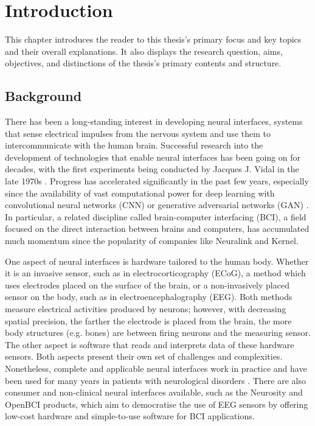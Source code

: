 \chapter{Introduction}
\graphicspath{{Chapter1/Figs/}{Chapter1/Figs/}}

This chapter introduces the reader to this thesis's primary focus and key topics and their overall explanations. It also displays the research question, aims, objectives, and distinctions of the thesis's primary contents and structure.

\section{Background}
\label{chapter1-background}

There has been a long-standing interest in developing neural interfaces, systems that sense electrical impulses from the nervous system and use them to intercommunicate with the human brain. Successful research into the development of technologies that enable neural interfaces has been going on for decades, with the first experiments being conducted by Jacques J. Vidal in the late 1970s \citep{vidal_real-time_1977}. Progress has accelerated significantly in the past few years, especially since the availability of vast computational power for deep learning with convolutional neural networks (CNN) or generative adversarial networks (GAN) \citep{gonfalonieri_deep_2019}. In particular, a related discipline called brain-computer interfacing (BCI), a field focused on the direct interaction between brains and computers, has accumulated much momentum since the popularity of companies like Neuralink and Kernel.

One aspect of neural interfaces is hardware tailored to the human body. Whether it is an invasive sensor, such as in electrocorticography (ECoG), a method which uses electrodes placed on the surface of the brain, or a non-invasively placed sensor on the body, such as in electroencephalography (EEG). Both methods measure electrical activities produced by neurons; however, with decreasing spatial precision, the farther the electrode is placed from the brain, the more body structures (e.g. bones) are between firing neurons and the measuring sensor. The other aspect is software that reads and interprets data of these hardware sensors. Both aspects present their own set of challenges and complexities. Nonetheless, complete and applicable neural interfaces work in practice and have been used for many years in patients with neurological disorders \citep{braingate_publications_nodate}. There are also consumer and non-clinical neural interfaces available, such as the Neurosity and OpenBCI products, which aim to democratise the use of EEG sensors by offering low-cost hardware and simple-to-use software for BCI applications.


